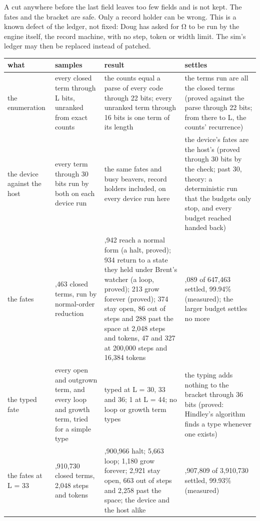 A cut anywhere before the last field leaves too few fields and is not kept. The fates and the bracket are safe. Only a record holder can be wrong. This is a known defect of the ledger, not fixed: Doug has asked for Ω to be run by the engine itself, the record machine, with no step, token or width limit. The sim's ledger may then be replaced instead of patched.

{\footnotesize
\setlength{\tabcolsep}{6pt}
\begin{longtable}{>{\RaggedRight\arraybackslash}p{}>{\RaggedRight\arraybackslash}p{}>{\RaggedRight\arraybackslash}p{}>{\RaggedRight\arraybackslash}p{}}
\toprule
what & samples & result & settles \\
\midrule
\endhead
the enumeration & every closed term through L bits, unranked from exact counts & the counts equal a parse of every code through 22 bits; every unranked term through 16 bits is one term of its length & the terms run are all the closed terms (proved against the parse through 22 bits; from there to L, the counts' recurrence) \\
the device against the host & every term through 30 bits run by both on each device run & the same fates and busy beavers, record holders included, on every device run here & the device's fates are the host's (proved through 30 bits by the check; past 30, theory: a deterministic run that the budgets only stop, and every budget reached handed back) \\
the fates & 647,463 closed terms, run by normal-order reduction & 645,942 reach a normal form (a halt, proved); 934 return to a state they held under Brent's watcher (a loop, proved); 213 grow forever (proved); 374 stay open, 86 out of steps and 288 past the space at 2,048 steps and tokens, 47 and 327 at 200,000 steps and 16,384 tokens & 647,089 of 647,463 settled, 99.94\% (measured); the larger budget settles no more \\
the typed fate & every open and outgrown term, and every loop and growth term, tried for a simple type & 0 typed at L = 30, 33 and 36; 1 at L = 44; no loop or growth term types & the typing adds nothing to the bracket through 36 bits (proved: Hindley's algorithm finds a type whenever one exists) \\
the fates at L = 33 & 3,910,730 closed terms, 2,048 steps and tokens & 3,900,966 halt; 5,663 loop; 1,180 grow forever; 2,921 stay open, 663 out of steps and 2,258 past the space; the device and the host alike & 3,907,809 of 3,910,730 settled, 99.93\% (measured) \\

\end{longtable}}
